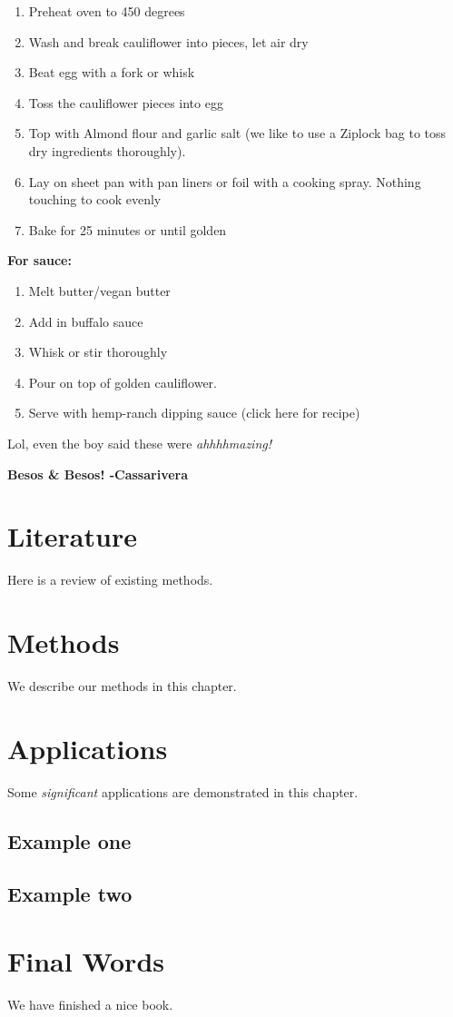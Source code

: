 \documentclass[]{book}
\providecommand{\tightlist}{%
  \setlength{\itemsep}{0pt}\setlength{\parskip}{0pt}}
\begin{document}
\begin{enumerate}
\def\labelenumi{\arabic{enumi}.}
\tightlist
\item
  Preheat oven to 450 degrees
\item
  Wash and break cauliflower into pieces, let air dry
\item
  Beat egg with a fork or whisk
\item
  Toss the cauliflower pieces into egg
\item
  Top with Almond flour and garlic salt (we like to use a Ziplock bag to
  toss dry ingredients thoroughly).\\
\item
  Lay on sheet pan with pan liners or foil with a cooking spray. Nothing
  touching to cook evenly
\item
  Bake for 25 minutes or until golden
\end{enumerate}

\textbf{For sauce:}

\begin{enumerate}
\def\labelenumi{\arabic{enumi}.}
\tightlist
\item
  Melt butter/vegan butter
\item
  Add in buffalo sauce
\item
  Whisk or stir thoroughly
\item
  Pour on top of golden cauliflower.
\item
  Serve with hemp-ranch dipping sauce (click here for recipe)
\end{enumerate}

Lol, even the boy said these were \emph{ahhhhmazing!}

\textbf{Besos \& Besos! -Cassarivera}

\chapter{Literature}\label{literature}

Here is a review of existing methods.

\chapter{Methods}\label{methods}

We describe our methods in this chapter.

\chapter{Applications}\label{applications}

Some \emph{significant} applications are demonstrated in this chapter.

\section{Example one}\label{example-one}

\section{Example two}\label{example-two}

\chapter{Final Words}\label{final-words}

We have finished a nice book.


\end{document}
